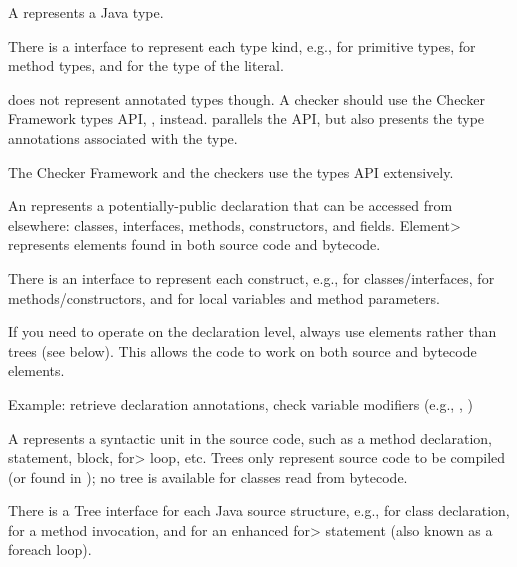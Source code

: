 A  represents a Java type.

\begin{sloppypar}
There is a  interface to represent each type kind,
e.g.,  for primitive types, 
for method types, and  for the type of the  literal.
\end{sloppypar}

 does not represent annotated types though.  A checker
should use the Checker Framework types API,
, instead.  
parallels the  API, but also presents the type annotations
associated with the type.

The Checker Framework and the checkers use the types API extensively.



An  represents a potentially-public
declaration that can be accessed from elsewhere:  classes, interfaces, methods, constructors, and
fields.  \<Element> represents elements found in both source
code and bytecode.

There is an  interface to represent each construct, e.g.,
 for classes/interfaces,  for
methods/constructors, and  for local variables and
method parameters.

If you need to operate on the declaration level, always use elements rather
than trees
(see below).  This allows the code to work on
both source and bytecode elements.

Example: retrieve declaration annotations, check variable
modifiers (e.g., , )



A  represents a syntactic unit in the source code,
such as a method declaration, statement, block, \<for> loop, etc. Trees only
represent source code to be compiled (or found in );
no tree is available for classes read from bytecode.

There is a Tree interface for each Java source structure, e.g.,
 for class declaration, 
for a method invocation, and  for an enhanced \<for>
statement (also known as a foreach loop).

